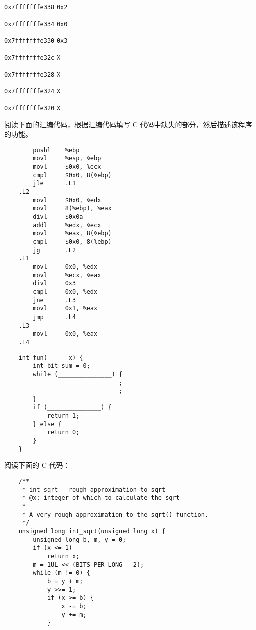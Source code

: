 \begin{problems}
\begin{compactdesc}
            \item[\texttt{0x7fffffffe338}] \verb|0x2|
            \item[\texttt{0x7fffffffe334}] \verb|0x0|
            \item[\texttt{0x7fffffffe330}] \verb|0x3|
            \item[\texttt{0x7fffffffe32c}] \verb|X|
            \item[\texttt{0x7fffffffe328}] \verb|X|
            \item[\texttt{0x7fffffffe324}] \verb|X|
            \item[\texttt{0x7fffffffe320}] \verb|X|
        \end{compactdesc}
         阅读下面的汇编代码，根据汇编代码填写 C 代码中缺失的部分，然后描述该程序的功能。
        \begin{verbatim}
        pushl    %ebp
        movl     %esp, %ebp
        movl     $0x0, %ecx
        cmpl     $0x0, 8(%ebp)
        jle      .L1
    .L2
        movl     $0x0, %edx
        movl     8(%ebp), %eax
        divl     $0x0a
        addl     %edx, %ecx
        movl     %eax, 8(%ebp)
        cmpl     $0x0, 8(%ebp)
        jg       .L2
    .L1
        movl     0x0, %edx
        movl     %ecx, %eax
        divl     0x3
        cmpl     0x0, %edx
        jne      .L3
        movl     0x1, %eax
        jmp      .L4
    .L3
        movl     0x0, %eax
    .L4 
        \end{verbatim}
        \begin{verbatim}
    int fun(_____ x) {
        int bit_sum = 0;
        while (_______________) {
            ____________________;
            ____________________;
        }
        if (_______________) {
            return 1;
        } else {
            return 0;
        }
    }
        \end{verbatim}
         阅读下面的 C 代码：
        \begin{verbatim}
    /**
     * int_sqrt - rough approximation to sqrt
     * @x: integer of which to calculate the sqrt
     *
     * A very rough approximation to the sqrt() function.
     */ 
    unsigned long int_sqrt(unsigned long x) {
        unsigned long b, m, y = 0;
        if (x <= 1) 
            return x; 
        m = 1UL << (BITS_PER_LONG - 2); 
        while (m != 0) {
            b = y + m; 
            y >>= 1; 
            if (x >= b) {
                x -= b;
                y += m; 
            } 

\end{verbatim}
\end{problems}
